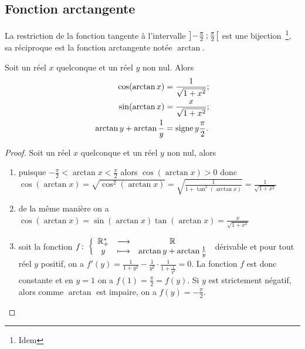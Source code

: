 \subsection{Fonction arctangente}\label{subsec:chap1-fonctionarctangente}

\begin{defdef}
  La restriction de la fonction tangente à l'intervalle
  \(\left] -\frac{\pi}{2} \, ; {} \frac{\pi}{2} \right[\) est une
  bijection~\footnote{Idem}, sa réciproque est la fonction arctangente notée
  \(\arctan\).
\end{defdef}

\begin{prop}
  Soit un réel \(x\) quelconque et un réel \(y\) non nul. Alors
  \begin{align*}
    \cos(\arctan{x})& = \frac{1}{\sqrt{1+x^2}};\\
    \sin(\arctan{x})& = \frac{x}{\sqrt{1+x^2}};\\
    \arctan{y} + \arctan{\frac{1}{y}} &= \operatorname{signe}{y}\frac{\pi}{2}.
  \end{align*}
\end{prop}

\begin{proof}
  Soit un réel \(x\) quelconque et un réel \(y\) non nul, alors
  \begin{enumerate}
    \item puisque \(-\frac{\pi}{2} < \arctan x < \frac{\pi}{2}\) alors
      \(\cos(\arctan x)>0\) donc
      \(\cos(\arctan x) = \sqrt{\cos^2(\arctan x)} =
      \sqrt{\frac{1}{1+\tan^2(\arctan x)}} = \frac{1}{\sqrt{1+x^2}}\)
    \item de la même manière on a
      \(\cos(\arctan x) = \sin( \arctan x) \tan(\arctan x) =
      \frac{x}{\sqrt{1+x^2}}\)
    \item soit la fonction \(f\colon\left\{\begin{array}{ccc}\mathbb{R}_{+}^{*} & \longrightarrow &\mathbb{R}\\y & \longmapsto & \arctan y +
      \arctan \frac{1}{y}\end{array}\right.\) dérivable et pour tout réel \(y\) positif, on a
      \(f'(y) = \frac{1}{1+y^2} - \frac{1}{y^2} \cdot \frac{1}{1+\frac{1}{y^2}}
      = 0\). La fonction \(f\) est donc constante et en \(y = 1\) on a \(f(1) =
      \frac{\pi}{2} = f(y)\). Si \(y\) est strictement négatif, alors comme
      \(\arctan\) est impaire, on a \(f(y) = -\frac{\pi}{2}\).
  \end{enumerate}
\end{proof}

